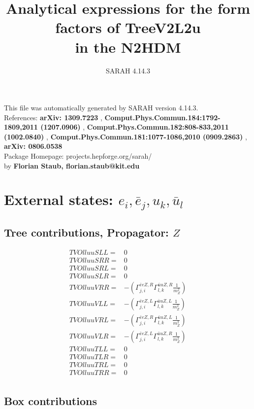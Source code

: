 \documentclass[A4,landscape]{article}
\begin{document}
\title{Analytical expressions for the form factors of TreeV2L2u\\ in the N2HDM } 
 \author{SARAH 4.14.3} 
 \maketitle 
 \vspace{10cm} 
This file was automatically generated by SARAH version 4.14.3.  \\ 
References: {\bf arXiv: 1309.7223 }, {\bf Comput.Phys.Commun.184:1792-1809,2011 (1207.0906) }, {\bf Comput.Phys.Commun.182:808-833,2011 (1002.0840) }, {\bf Comput.Phys.Commun.181:1077-1086,2010 (0909.2863) }, {\bf arXiv: 0806.0538 } \\ 
Package Homepage: projects.hepforge.org/sarah/ \\ 
by {\bf Florian Staub, florian.staub@kit.edu} 
 \pagebreak 
 \tableofcontents 
 \pagebreak 
\section{External states: ${e_{{i}}, \bar{e}_{{j}}, u_{{k}}, \bar{u}_{{l}}}$} 
\subsection{Tree contributions, Propagator: $Z$} 

\begin{align} 
  TVOlluuSLL= & 0 \\ 
  TVOlluuSRR= & 0 \\ 
  TVOlluuSRL= & 0 \\ 
  TVOlluuSLR= & 0 \\ 
  TVOlluuVRR= & -(\Gamma^{\bar{e}e Z ,R}_{j, i} \Gamma^{\bar{u}u Z ,R}_{l, k} \frac{1}{m^2_{Z}}) \\ 
  TVOlluuVLL= & -(\Gamma^{\bar{e}e Z ,L}_{j, i} \Gamma^{\bar{u}u Z ,L}_{l, k} \frac{1}{m^2_{Z}}) \\ 
  TVOlluuVRL= & -(\Gamma^{\bar{e}e Z ,R}_{j, i} \Gamma^{\bar{u}u Z ,L}_{l, k} \frac{1}{m^2_{Z}}) \\ 
  TVOlluuVLR= & -(\Gamma^{\bar{e}e Z ,L}_{j, i} \Gamma^{\bar{u}u Z ,R}_{l, k} \frac{1}{m^2_{Z}}) \\ 
  TVOlluuTLL= & 0 \\ 
  TVOlluuTLR= & 0 \\ 
  TVOlluuTRL= & 0 \\ 
  TVOlluuTRR= & 0 \\ 
\end{align} 
\subsection{Box contributions} 
\end{document}
